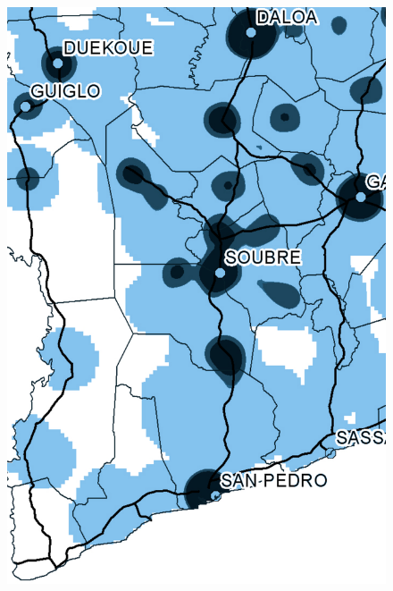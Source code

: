 \begin{figure}[h!]
{    \includegraphics[scale = 0.1]{results/images/kernel/20_detail_p2.pdf}
	\label{fig:subfig2_detail}
}
\subfigure[Monday, 21:00]{
}
\end{figure}
